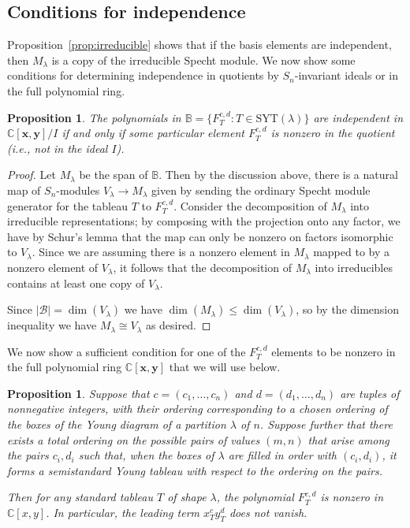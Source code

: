 \documentclass[11pt]{article}
\newtheorem{prop}[theo]{Proposition}
\theoremstyle{definition}
\numberwithin{equation}{section}
\newcommand{\SYT}{\mathrm{SYT}}
\begin{document}
\subsection{Conditions for independence}

Proposition~\ref{prop:irreducible} shows that if the basis elements are independent, then $M_\lambda$ is a copy of the irreducible Specht module.  We now show some conditions for determining independence in quotients by $S_n$-invariant ideals or in the full polynomial ring. 

\begin{prop}\label{prop:nonzero}
	The polynomials in $\mathbb{B}=\{F_T^{c,d}:T\in \SYT(\lambda)\}$ are independent in $\mathbb{C}[\mathbf{x},\mathbf{y}]/I$ if and only if some particular element $F_T^{c,d}$ is nonzero in the quotient (i.e., not in the ideal $I$).  
\end{prop}

\begin{proof}
	Let $M_\lambda$ be the span of $\mathbb{B}$.  Then by the discussion above, there is a natural map of $S_n$-modules $V_\lambda\to M_\lambda$ given by sending the ordinary Specht module generator for the tableau $T$ to $F_T^{c,d}$.  Consider the decomposition of $M_\lambda$ into irreducible representations; by composing with the projection onto any factor, we have by Schur's lemma that the map can only be nonzero on factors isomorphic to $V_\lambda$.  Since we are assuming there is a nonzero element in $M_\lambda$ mapped to by a nonzero element of $V_\lambda$, it follows that the decomposition of $M_\lambda$ into irreducibles contains at least one copy of $V_\lambda$.
	
	Since $|\mathcal{B}|=\dim(V_\lambda)$ we have $\dim(M_\lambda)\le \dim(V_\lambda)$, so by the dimension inequality we have $M_\lambda\cong V_\lambda$ as desired.
\end{proof}

We now show a sufficient condition for one of the $F_T^{c,d}$ elements to be nonzero in the full polynomial ring $\mathbb{C}[\mathbf{x},\mathbf{y}]$ that we will use below.

\begin{prop}\label{prop:SSYT-values}
	Suppose that $c=(c_1,\ldots,c_n)$ and $d=(d_1,\ldots,d_n)$ are tuples of nonnegative integers, with their ordering corresponding to a chosen ordering of the boxes of the Young diagram of a partition $\lambda$ of $n$.  Suppose further that there exists a total ordering on the possible pairs of values $(m,n)$ that arise among the pairs $c_i,d_i$ such that, when the boxes of $\lambda$ are filled in order with $(c_i,d_i)$, it forms a semistandard Young tableau with respect to the ordering on the pairs.
	
	Then for any standard tableau $T$ of shape $\lambda$, the polynomial $F_{T}^{c,d}$ is nonzero in $\mathbb{C}[x,y]$.  In particular, the leading term $x_T^cy_T^d$ does not vanish.
\end{prop}
\end{document}
